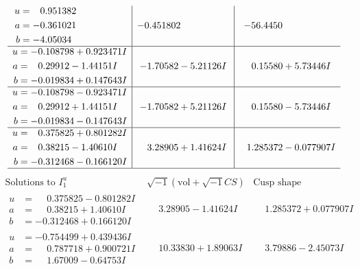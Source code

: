 \documentclass[1p]{elsarticle_modified}
\theoremstyle{definition}
\newcommand{\I}{\sqrt{-1}}
\begin{document}
$$\begin{array}{c|c|c}
\begin{aligned}
u &= \phantom{-}0.951382\phantom{ +0.000000I} \\
a &= -0.361021\phantom{ +0.000000I} \\
b &= -4.05034\phantom{ +0.000000I}\end{aligned}
 & -0.451802\phantom{ +0.000000I} & -56.4450\phantom{ +0.000000I} \\ \hline\begin{aligned}
u &= -0.108798 + 0.923471 I \\
a &= \phantom{-}0.29912 - 1.44151 I \\
b &= -0.019834 + 0.147643 I\end{aligned}
 & -1.70582 - 5.21126 I & \phantom{-}0.15580 + 5.73446 I \\ \hline\begin{aligned}
u &= -0.108798 - 0.923471 I \\
a &= \phantom{-}0.29912 + 1.44151 I \\
b &= -0.019834 - 0.147643 I\end{aligned}
 & -1.70582 + 5.21126 I & \phantom{-}0.15580 - 5.73446 I \\ \hline\begin{aligned}
u &= \phantom{-}0.375825 + 0.801282 I \\
a &= \phantom{-}0.38215 - 1.40610 I \\
b &= -0.312468 - 0.166120 I\end{aligned}
 & \phantom{-}3.28905 + 1.41624 I & \phantom{-}1.285372 - 0.077907 I\\
 \hline 
 \end{array}$$\newpage$$\begin{array}{c|c|c}  
\text{Solutions to }I^u_{1}& \I (\text{vol} + \sqrt{-1}CS) & \text{Cusp shape}\\
 \hline 
\begin{aligned}
u &= \phantom{-}0.375825 - 0.801282 I \\
a &= \phantom{-}0.38215 + 1.40610 I \\
b &= -0.312468 + 0.166120 I\end{aligned}
 & \phantom{-}3.28905 - 1.41624 I & \phantom{-}1.285372 + 0.077907 I \\ \hline\begin{aligned}
u &= -0.754499 + 0.439436 I \\
a &= \phantom{-}0.787718 + 0.900721 I \\
b &= \phantom{-}1.67009 - 0.64753 I\end{aligned}
 & \phantom{-}10.33830 + 1.89063 I & \phantom{-}3.79886 - 2.45073 I \\ \hline\begin{aligned}

\end{aligned}
\end{array}$$
\end{document}

